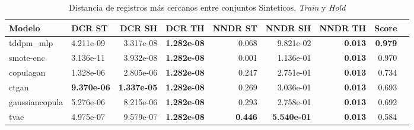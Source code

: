 \begin{table}[H]
\centering
\caption{Distancia de registros más cercanos entre conjuntos Sinteticos, \emph{Train} y \emph{Hold}}
\label{table-dcr-economicos-a-3}
\begin{tabular}{|l|l|r|r|r|r|r|r|r|}
\hline
\rowcolor[gray]{0.8}
Modelo & DCR ST & DCR SH & DCR TH & NNDR ST & NNDR SH & NNDR TH & \textbf{Score} \\
\hline tddpm\_mlp & 4.211e-09 & \cellcolor[rgb]{0.9, 0.54, 0.52} 3.317e-08 & \bfseries 1.282e-08 & 0.068 & 9.821e-02 & \bfseries 0.013 & \bfseries 0.979 \\
\hline smote-enc & \cellcolor[rgb]{0.9, 0.54, 0.52} 3.136e-11 & 3.932e-08 & \bfseries 1.282e-08 & 0.001 & 1.136e-01 & \bfseries 0.013 & 0.970 \\
\hline copulagan & 1.328e-06 & 2.805e-06 & \bfseries 1.282e-08 & 0.247 & 2.751e-01 & \bfseries 0.013 & 0.734 \\
\hline ctgan & \bfseries 9.370e-06 & \bfseries 1.337e-05 & \bfseries 1.282e-08 & 0.269 & 3.036e-01 & \bfseries 0.013 & 0.693 \\
\hline gaussiancopula & 5.276e-06 & 8.215e-06 & \bfseries 1.282e-08 & 0.293 & 2.758e-01 & \bfseries 0.013 & 0.692 \\
\hline tvae & 4.975e-07 & 9.579e-07 & \bfseries 1.282e-08 & \bfseries 0.446 & \bfseries 5.540e-01 & \bfseries 0.013 & 0.584 \\
\hline
\end{tabular}
\end{table}
